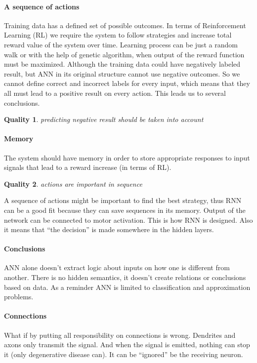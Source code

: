 \documentclass[draft]{article}
\newtheorem{Qual}{Quality}
\begin{document}
\paragraph{A sequence of actions}
Training data has a defined set of possible outcomes. In terms of Reinforcement Learning (RL) we require the system to follow strategies and increase total reward value of the system over time.
Learning process can be just a random walk or with the help of genetic algorithm, when output of the reward function must be maximized.
Although the training data could have negatively labeled result, but ANN in its original structure cannot use negative outcomes. So we cannot define correct and incorrect labels for every input, which means that they all must lead to a positive result on every action. This leads us to several conclusions. 

\begin{Qual}\label{q2}
  predicting negative result should be taken into account
\end{Qual}

\paragraph{Memory}

The system should have memory in order to store appropriate responses to input signals that lead to a reward increase (in terms of RL).

\begin{Qual}\label{q3}
  actions are important in sequence
\end{Qual}

A sequence of actions might be important to find the best strategy, thus RNN can be a good fit because they can save sequences in its memory. Output of the network can be connected to motor activation. This is how RNN is designed. Also it means that “the decision” is made somewhere in the hidden layers. 



\paragraph{Conclusions}
ANN alone doesn’t extract logic about inputs on how one is different from another. There is no hidden semantics, it doesn’t create relations or conclusions based on data. As a reminder ANN is limited to classification and approximation problems.



\paragraph{Connections}
What if by putting all responsibility on connections is wrong. Dendrites and axons only transmit the signal. And when the signal is emitted, nothing can stop it (only degenerative disease can). It can be “ignored” be the receiving neuron.
\end{document}

